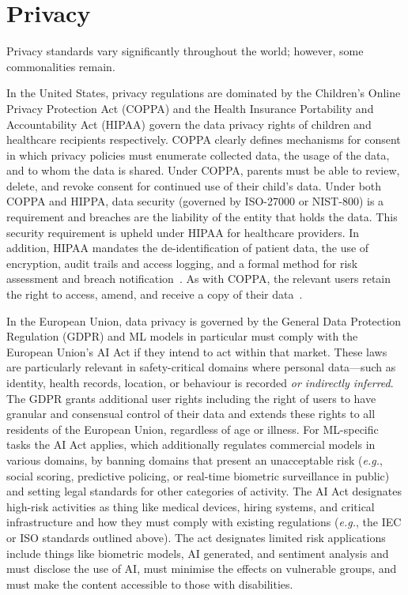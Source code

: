 \section{Privacy }
\label{privacy}

Privacy standards vary significantly throughout the world; however, some commonalities remain.

In the United States, privacy regulations are dominated by the Children's Online Privacy Protection Act (COPPA) and the Health Insurance Portability and Accountability Act (HIPAA) govern the data privacy rights of children and healthcare recipients respectively. 
COPPA clearly defines mechanisms for consent in which privacy policies must enumerate collected data, the usage of the data, and to whom the data is shared. 
Under COPPA, parents must be able to review, delete, and revoke consent for continued use of their child's data. 
Under both COPPA and HIPPA, data security (governed by ISO-27000 or NIST-800) is a requirement and breaches are the liability of the entity that holds the data.
This security requirement is upheld under HIPAA for healthcare providers. 
In addition, HIPAA mandates the de-identification of patient data, the use of encryption, audit trails and access logging, and a formal method for risk assessment and breach notification~\cite{hipaa}. 
As with COPPA, the relevant users retain the right to access, amend, and receive a copy of their data~\cite{coppa,hipaa}. 

In the European Union, data privacy is governed by the General Data Protection Regulation (GDPR) and ML models in particular must comply with the European Union's AI Act if they intend to act within that market.
These laws are particularly relevant in safety-critical domains where personal data---such as identity, health records, location, or behaviour is recorded \textit{or indirectly inferred}. 
The GDPR grants additional user rights including the right of users to have granular and consensual control of their data and extends these rights to all residents of the European Union, regardless of age or illness.
For ML-specific tasks the AI Act applies, which additionally regulates commercial models in various domains, by banning domains that present an unacceptable risk (\textit{e.g.}, social scoring, predictive policing, or real-time biometric surveillance in public) and setting legal standards for other categories of activity.
The AI Act designates high-risk activities as thing like medical devices, hiring systems, and critical infrastructure and how they must comply with existing regulations (\textit{e.g.}, the IEC or ISO standards outlined above). 
The act designates limited risk applications include things like biometric models, AI generated, and sentiment analysis and must disclose the use of AI, must minimise the effects on vulnerable groups, and must make the content accessible to those with disabilities. 

